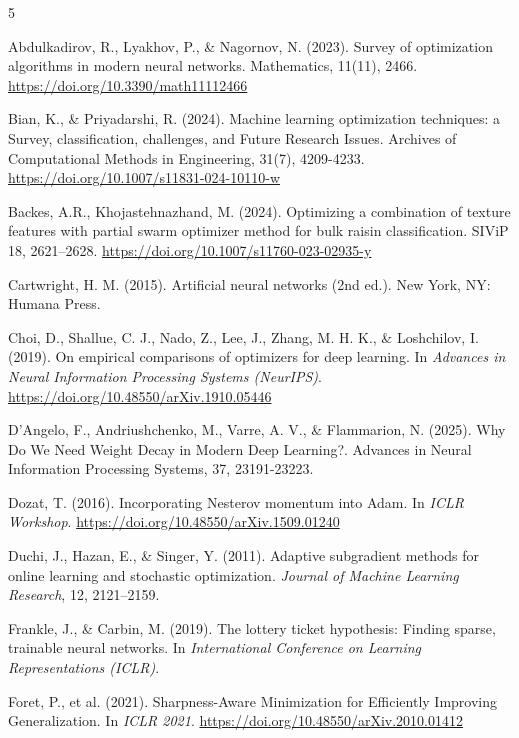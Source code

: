 \documentclass{article}
\begin{document}
\begin{thebibliography}{5}

Abdulkadirov, R., Lyakhov, P., \& Nagornov, N. (2023). Survey of optimization algorithms in modern neural networks. Mathematics, 11(11), 2466. \url{https://doi.org/10.3390/math11112466}

Bian, K., \& Priyadarshi, R. (2024). Machine learning optimization techniques: a Survey, classification, challenges, and Future Research Issues. Archives of Computational Methods in Engineering, 31(7), 4209-4233. \url{https://doi.org/10.1007/s11831-024-10110-w}

Backes, A.R., Khojastehnazhand, M. (2024).  Optimizing a combination of texture features with partial swarm optimizer method for bulk raisin classification. SIViP 18, 2621–2628. \url{https://doi.org/10.1007/s11760-023-02935-y}

Cartwright, H. M. (2015). Artificial neural networks (2nd ed.). New York, NY: Humana Press. 

Choi, D., Shallue, C. J., Nado, Z., Lee, J., Zhang, M. H. K., \& Loshchilov, I. (2019). On empirical comparisons of optimizers for deep learning. In \textit{Advances in Neural Information Processing Systems (NeurIPS)}. \url{https://doi.org/10.48550/arXiv.1910.05446}

D'Angelo, F., Andriushchenko, M., Varre, A. V., \& Flammarion, N. (2025). Why Do We Need Weight Decay in Modern Deep Learning?. Advances in Neural Information Processing Systems, 37, 23191-23223.

Dozat, T. (2016). Incorporating Nesterov momentum into Adam. In \textit{ICLR Workshop}. \url{https://doi.org/10.48550/arXiv.1509.01240}

Duchi, J., Hazan, E., \& Singer, Y. (2011). Adaptive subgradient methods for online learning and stochastic optimization. \textit{Journal of Machine Learning Research}, 12, 2121--2159.

Frankle, J., \& Carbin, M. (2019). The lottery ticket hypothesis: Finding sparse, trainable neural networks. In \textit{International Conference on Learning Representations (ICLR)}.

Foret, P., et al. (2021). Sharpness-Aware Minimization for Efficiently Improving Generalization. In \textit{ICLR 2021}. \url{https://doi.org/10.48550/arXiv.2010.01412}


\end{thebibliography}
\end{document}
